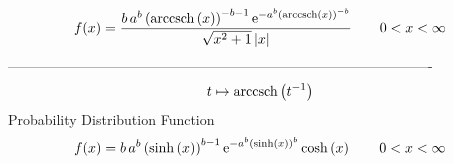 \documentclass[12pt]{article}
\begin{document}
$$  f(x)={\frac {b\,{a}^{b} \left( {\rm arccsch} \left(x\right) \right) ^{-b-1}
{{\rm e}^{-{a}^{b} \left( {\rm arccsch} \left(x\right) \right) ^{-b}}}
}{\sqrt {{x}^{2}+1} \left| x \right| }}
 \qquad0
 < x < \infty 
$$-------------------------------------------------------------------------------------------  \\$$t\mapsto {\rm arccsch} \left({t}^{-1}\right)
$$Probability Distribution Function 
$$  f(x)=b\,{a}^{b} \left( \sinh \left( x \right)  \right) ^{b-1}{{\rm e}^{-{a}
^{b} \left( \sinh \left( x \right)  \right) ^{b}}}\cosh \left( x
 \right) 
 \qquad0
 < x < \infty 
$$
\end{document}
